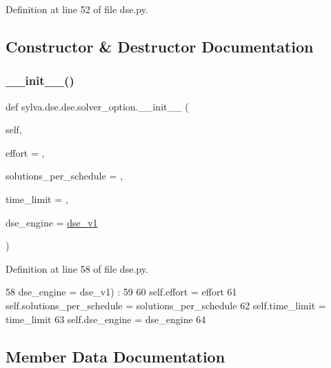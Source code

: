 Definition at line 52 of file dse.\+py.



\subsection{Constructor \& Destructor Documentation}
\mbox{\label{classsylva_1_1dse_1_1dse_1_1solver__option_a9dc8c1ee5f29aeabb4b6587974adfbec}} 
\subsubsection{\texorpdfstring{\+\_\+\+\_\+init\+\_\+\+\_\+()}{\_\_init\_\_()}}
{\footnotesize\ttfamily def sylva.\+dse.\+dse.\+solver\+\_\+option.\+\_\+\+\_\+init\+\_\+\+\_\+ (\begin{DoxyParamCaption}\item[{}]{self,  }\item[{}]{effort = {},  }\item[{}]{solutions\+\_\+per\+\_\+schedule = {},  }\item[{}]{time\+\_\+limit = {},  }\item[{}]{dse\+\_\+engine = {\ttfamily \hyperlink{classsylva_1_1dse_1_1dse__engine__v1_1_1dse__v1}{dse\+\_\+v1}} }\end{DoxyParamCaption})}



Definition at line 58 of file dse.\+py.


\begin{DoxyCode}
58     dse\_engine = dse\_v1) :
59 
60     self.effort = effort
61     self.solutions\_per\_schedule = solutions\_per\_schedule
62     self.time\_limit = time\_limit
63     self.dse\_engine = dse\_engine
64 
\end{DoxyCode}


\subsection{Member Data Documentation}
\mbox{\label{classsylva_1_1dse_1_1dse_1_1solver__option_a7a53af2287a6078049559a565fbb9e90}} 

